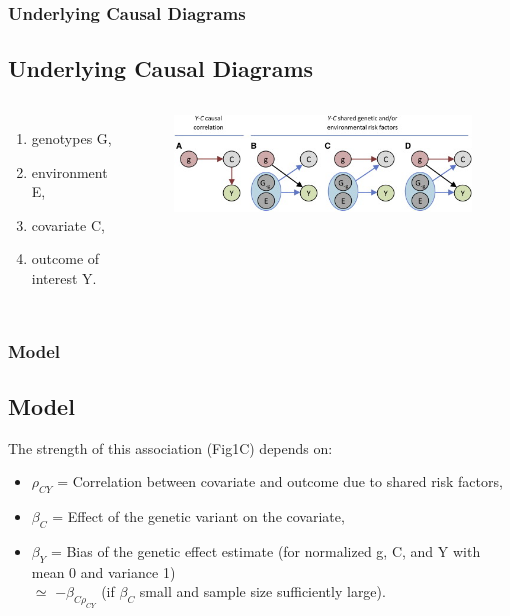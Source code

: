 \documentclass{beamer}
\begin{document}
\begin{frame}
\frametitle{Underlying Causal Diagrams}
\subsection{Underlying Causal Diagrams}
\begin{columns}[c] %


\begin{enumerate}
\item genotypes G, 
\item environment E,
\item covariate C,
\item outcome of interest Y.
\end{enumerate}

\begin{figure}
\includegraphics[width=1\linewidth]{fig_1}
\end{figure}

\end{columns}
\end{frame}
\begin{frame}
\frametitle{Model}
\subsection{Model}
The strength of this association (Fig1C) depends on:

\begin{itemize}
\item $\rho_{CY}$ = Correlation between covariate and outcome due to shared risk factors, \vspace{0.5cm}
\item $\beta_{C}$ = Effect of the genetic variant on the covariate,\vspace{0.5cm}
\item $ \widehat{\beta_{Y}}$ = Bias of the genetic effect estimate (for normalized g, C, and Y with mean 0 and variance 1)\\  \hspace{0.7cm}$\simeq$ $-\beta_{C\rho_{CY}}$ (if $\beta_{C}$ small and sample size sufficiently large). 
\end{itemize}

\end{frame}
\end{document}
